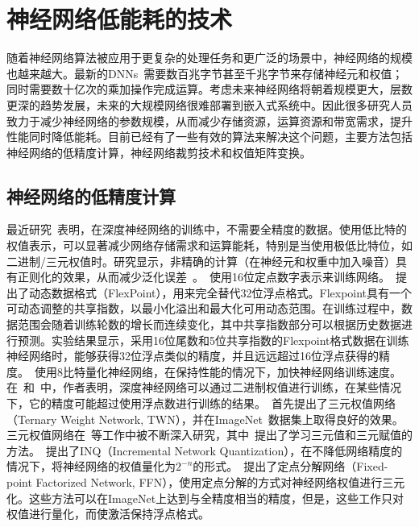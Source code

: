 \section{神经网络低能耗的技术}
随着神经网络算法被应用于更复杂的处理任务和更广泛的场景中，神经网络的规模也越来越大。最新的DNNs~\cite{le2013building, coates2013deep}需要数百兆字节甚至千兆字节来存储神经元和权值；同时需要数十亿次的乘加操作完成运算。考虑未来神经网络将朝着规模更大，层数更深的趋势发展，未来的大规模网络很难部署到嵌入式系统中。因此很多研究人员致力于减少神经网络的参数规模，从而减少存储资源，运算资源和带宽需求，提升性能同时降低能耗。目前已经有了一些有效的算法来解决这个问题，主要方法包括神经网络的低精度计算，神经网络裁剪技术和权值矩阵变换。

\subsection{神经网络的低精度计算}

最近研究~\cite{gupta2015deep}表明，在深度神经网络的训练中，不需要全精度的数据。使用低比特的权值表示，可以显著减少网络存储需求和运算能耗，特别是当使用极低比特位，如二进制/三元权值时。研究显示，非精确的计算（在神经元和权重中加入噪音）具有正则化的效果，从而减少泛化误差~\cite{goodfellow2016deep}。~\citet{gupta2015deep}使用16位定点数字表示来训练网络。~\citet{koster2017flexpoint}提出了动态数据格式（FlexPoint），用来完全替代32位浮点格式。Flexpoint具有一个可动态调整的共享指数，以最小化溢出和最大化可用动态范围。在训练过程中，数据范围会随着训练轮数的增长而连续变化，其中共享指数部分可以根据历史数据进行预测。实验结果显示，采用16位尾数和5位共享指数的Flexpoint格式数据在训练神经网络时，能够获得32位浮点类似的精度，并且远远超过16位浮点获得的精度。~\citet{dettmers20158}使用8比特量化神经网络，在保持性能的情况下，加快神经网络训练速度。在~\cite{courbariaux2015binaryconnect}和~\cite{hu2018hashing}中，作者表明，深度神经网络可以通过二进制权值进行训练，在某些情况下，它的精度可能超过使用浮点数进行训练的结果。~\citet{rastegari2016xnor}首先提出了三元权值网络（Ternary Weight Network, TWN），并在ImageNet~\cite{russakovsky2015imagenet}数据集上取得良好的效果。三元权值网络在~\cite{li2016ternary,zhu2016trained}等工作中被不断深入研究，其中~\cite{zhu2016trained}提出了学习三元值和三元赋值的方法。~\citet{zhou2017incremental}提出了INQ（Incremental Network Quantization），在不降低网络精度的情况下，将神经网络的权值量化为$2^{-n}$的形式。~\citet{wang2017fixed}提出了定点分解网络（Fixed-point Factorized Network, FFN），使用定点分解的方式对神经网络权值进行三元化。这些方法可以在ImageNet上达到与全精度相当的精度，但是，这些工作只对权值进行量化，而使激活保持浮点格式。

